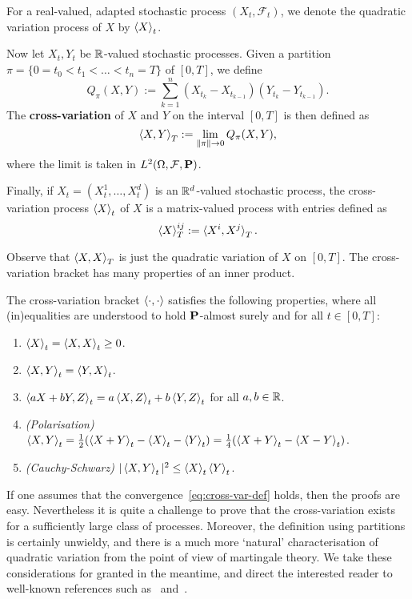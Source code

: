 \begin{definition}
\label{def:cross-var}
For a real-valued, adapted stochastic process $(X_t,\mathcal{F}_t)$, we denote the quadratic variation process of $X$ by $\braket{X}_t$.

Now let $X_t, Y_t$ be $\mathbb{R}$-valued stochastic processes. Given a partition $\pi = \{0=t_0<t_1<\ldots <t_n=T\}$ of $[0,T]$, we define
\begin{equation*}
    Q_\pi(X,Y) := \sum_{k=1}^n (X_{t_k}-X_{t_{k-1}})(Y_{t_k}-Y_{t_{k-1}}).
\end{equation*}
The \textbf{cross-variation} of $X$ and $Y$ on the interval $[0,T]$ is then defined as
\begin{equation}
\label{eq:cross-var-def}
    \braket{X,Y}_T := \lim_{\|\pi\|\to 0} Q_\pi(X,Y),
\end{equation}
where the limit is taken in $L^2(\Omega,\mathcal{F},\mathbf{P})$.

Finally, if $X_t=(X^1_t,\ldots,X^d_t)$ is an $\mathbb{R}^d$-valued stochastic process, the cross-variation process $\braket{X}_t$ of $X$ is a matrix-valued process with entries defined as
\begin{equation*}
    \braket{X}_T^{ij} := \braket{X^i,X^j}_T.
\end{equation*}
\end{definition}

Observe that $\braket{X,X}_T$ is just the quadratic variation of $X$ on $[0,T]$. The cross-variation bracket has many properties of an inner product.
\begin{proposition}
\label{prop:cross-var}
The cross-variation bracket $\braket{\cdot, \cdot}$ satisfies the following properties, where all (in)equalities are understood to hold $\mathbf{P}$-almost surely and for all $t\in [0,T]$:
\begin{enumerate}[\upshape (i)]
    \item $\braket{X}_t = \braket{X,X}_t \ge 0$.
    \item $\braket{X,Y}_t = \braket{Y,X}_t$.
    \item $\braket{aX + bY, Z}_t = a\braket{X,Z}_t + b\braket{Y,Z}_t$ for all $a,b\in\mathbb{R}$.
    \item \emph{(Polarisation)} $\braket{X, Y}_t = \frac{1}{2}(\braket{X+Y}_t - \braket{X}_t - \braket{Y}_t) = \frac{1}{4}(\braket{X+Y}_t - \braket{X-Y}_t)$.
    \item \emph{(Cauchy-Schwarz)} $|\braket{X,Y}_t|^2\le \braket{X}_t \braket{Y}_t$.
\end{enumerate}
\end{proposition}
If one assumes that the convergence~\eqref{eq:cross-var-def} holds, then the proofs are easy. Nevertheless it is quite a challenge to prove that the cross-variation exists for a sufficiently large class of processes. Moreover, the definition using partitions is certainly unwieldy, and there is a much more `natural' characterisation of quadratic variation from the point of view of martingale theory. We take these considerations for granted in the meantime, and direct the interested reader to well-known references such as~\cite[Chapter IV]{RY} and~\cite[Chapters I, III]{KS}.

